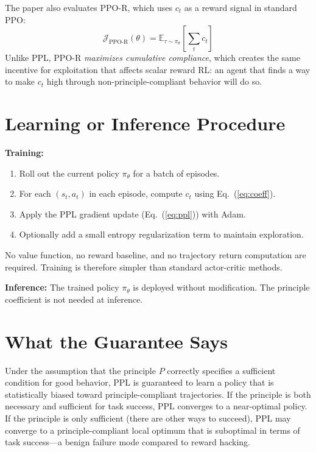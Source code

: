 \documentclass[10pt,twocolumn]{article}
\begin{document}
The paper also evaluates PPO-R, which uses $c_t$ as a reward signal in standard PPO:
\begin{equation}
\mathcal{J}_{\text{PPO-R}}(\theta) = \mathbb{E}_{\tau \sim \pi_\theta}\!\left[\sum_t c_t\right]
\label{eq:ppor}
\end{equation}
Unlike PPL, PPO-R \emph{maximizes cumulative compliance}, which creates the same incentive for exploitation that affects scalar reward RL: an agent that finds a way to make $c_t$ high through non-principle-compliant behavior will do so.

\section{Learning or Inference Procedure}

\textbf{Training:}
\begin{enumerate}[leftmargin=1.5em,itemsep=1pt]
  \item Roll out the current policy $\pi_\theta$ for a batch of episodes.
  \item For each $(s_t, a_t)$ in each episode, compute $c_t$ using Eq.~(\ref{eq:coeff}).
  \item Apply the PPL gradient update (Eq.~(\ref{eq:ppl})) with Adam.
  \item Optionally add a small entropy regularization term to maintain exploration.
\end{enumerate}

No value function, no reward baseline, and no trajectory return computation are required.
Training is therefore simpler than standard actor-critic methods.

\textbf{Inference:}
The trained policy $\pi_\theta$ is deployed without modification.
The principle coefficient is not needed at inference.

\section{What the Guarantee Says}

Under the assumption that the principle $P$ correctly specifies a sufficient condition for good behavior, PPL is guaranteed to learn a policy that is statistically biased toward principle-compliant trajectories.
If the principle is both necessary and sufficient for task success, PPL converges to a near-optimal policy.
If the principle is only sufficient (there are other ways to succeed), PPL may converge to a principle-compliant local optimum that is suboptimal in terms of task success---a benign failure mode compared to reward hacking.
\end{document}
